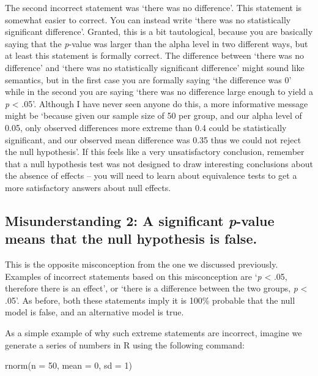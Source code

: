 \documentclass[
  oneside]{krantz}
\makeatletter
\newenvironment{Shaded}{\begin{snugshade}}{\end{snugshade}}
\newcommand{\AttributeTok}[1]{\textcolor[rgb]{0.61,0.61,0.61}{#1}}
\newcommand{\DecValTok}[1]{\textcolor[rgb]{0.06,0.06,0.06}{#1}}
\newcommand{\FunctionTok}[1]{\textcolor[rgb]{0,0,0}{#1}}
\newcommand{\NormalTok}[1]{#1}
\newenvironment{kframe}{%
\medskip{}
\setlength{\fboxsep}{.8em}
 \def\at@end@of@kframe{}%
 \ifinner\ifhmode%
  \def\at@end@of@kframe{\end{minipage}}%
  \begin{minipage}{\columnwidth}%
 \fi\fi%
 \def\FrameCommand##1{\hskip\@totalleftmargin \hskip-\fboxsep
 \colorbox{shadecolor}{##1}\hskip-\fboxsep
     \hskip-\linewidth \hskip-\@totalleftmargin \hskip\columnwidth}%
 \MakeFramed {\advance\hsize-\width
   \@totalleftmargin\z@ \linewidth\hsize
   \@setminipage}}%
 {\par\unskip\endMakeFramed%
 \at@end@of@kframe}
\renewenvironment{Shaded}{\begin{kframe}}{\end{kframe}}
\makeatother
\begin{document}
The second incorrect statement was `there was no difference'. This statement is somewhat easier to correct. You can instead write `there was no statistically significant difference'. Granted, this is a bit tautological, because you are basically saying that the \emph{p}-value was larger than the alpha level in two different ways, but at least this statement is formally correct. The difference between `there was no difference' and `there was no statistically significant difference' might sound like semantics, but in the first case you are formally saying `the difference was 0' while in the second you are saying `there was no difference large enough to yield a \emph{p} \textless{} .05'. Although I have never seen anyone do this, a more informative message might be `because given our sample size of 50 per group, and our alpha level of 0.05, only observed differences more extreme than 0.4 could be statistically significant, and our observed mean difference was 0.35 thus we could not reject the null hypothesis'. If this feels like a very unsatisfactory conclusion, remember that a null hypothesis test was not designed to draw interesting conclusions about the absence of effects -- you will need to learn about equivalence tests to get a more satisfactory answers about null effects.

\hypertarget{misunderstanding-2-a-significant-p-value-means-that-the-null-hypothesis-is-false.}{%
\subsection{\texorpdfstring{Misunderstanding 2: A significant \emph{p}-value means that the null hypothesis is false.}{Misunderstanding 2: A significant p-value means that the null hypothesis is false.}}\label{misunderstanding-2-a-significant-p-value-means-that-the-null-hypothesis-is-false.}}

This is the opposite misconception from the one we discussed previously. Examples of incorrect statements based on this misconception are `\emph{p} \textless{} .05, therefore there is an effect', or `there is a difference between the two groups, \emph{p} \textless{} .05'. As before, both these statements imply it is 100\% probable that the null model is false, and an alternative model is true.

As a simple example of why such extreme statements are incorrect, imagine we generate a series of numbers in R using the following command:

\begin{Shaded}
\begin{Highlighting}[]
\FunctionTok{rnorm}\NormalTok{(}\AttributeTok{n =} \DecValTok{50}\NormalTok{, }\AttributeTok{mean =} \DecValTok{0}\NormalTok{, }\AttributeTok{sd =} \DecValTok{1}\NormalTok{)}
\end{Highlighting}
\end{Shaded}
\end{document}
